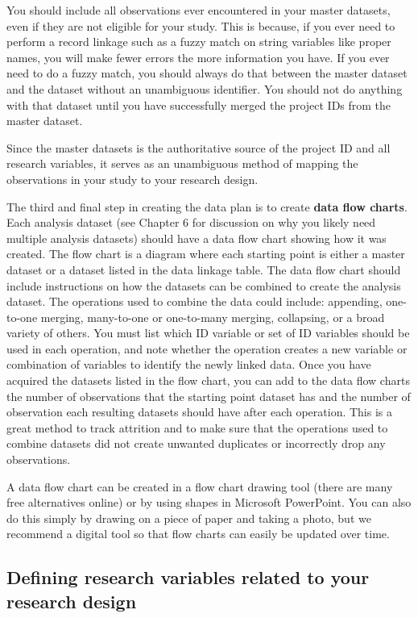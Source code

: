 You should include all observations ever encountered 
in your master datasets,
even if they are not eligible for your study.
This is because, if you ever need to perform a record linkage such as a fuzzy match
on string variables like proper names, 
you will make fewer errors the more information you have.
If you ever need to do a fuzzy match,
you should always do that between the master dataset
and the dataset without an unambiguous identifier.
You should not do anything with that dataset until
you have successfully merged
the project IDs from the master dataset.

Since the master datasets is the authoritative source 
of the project ID and all research variables,
it serves as an unambiguous method of mapping
the observations in your study to your research design.

The third and final step in creating the data plan is to create \textbf{data flow charts}.
Each analysis dataset
(see Chapter 6 for discussion on why you likely need multiple analysis datasets)
should have a data flow chart showing how it was created. 
The flow chart is a diagram 
where each starting point is either a master dataset 
or a dataset listed in the data linkage table.
The data flow chart should include instructions on how 
the datasets can be combined to create the analysis dataset.
The operations used to combine the data could include:
appending, one-to-one merging, 
many-to-one or one-to-many merging, collapsing, or a broad variety of others.
You must list which ID variable or set of ID variables
should be used in each operation,
and note whether the operation creates a new variable or combination of variables
to identify the newly linked data.
Once you have acquired the datasets listed in the flow chart, 
you can add to the data flow charts the number of observations that 
the starting point dataset has
and the number of observation each resulting datasets
should have after each operation. 
This is a great method to track attrition and to make sure that
the operations used to combine datasets did not create unwanted duplicates
or incorrectly drop any observations.

A data flow chart can be created in a flow chart drawing tool
(there are many free alternatives online) or
by using shapes in Microsoft PowerPoint. 
You can also do this simply by drawing on a piece of paper and taking a photo,
but we recommend a digital tool
so that flow charts can easily be updated over time. 

\subsection{Defining research variables related to your research design}

